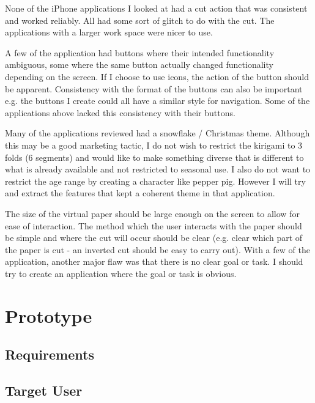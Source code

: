 \documentclass[11pt]{article}
\begin{document}
            None of the iPhone applications I looked at had a cut action that was consistent and worked reliably. All had some sort of glitch to do with the cut. The applications with a larger work space were nicer to use. 
            
            A few of the application had buttons where their intended functionality ambiguous, some where the same button actually changed functionality depending on the screen. If I choose to use icons, the action of the button should be apparent. Consistency with the format of the buttons can also be important e.g. the buttons I create could all have a similar style for navigation. Some of the applications above lacked this consistency with their buttons. 
            
            Many of the applications reviewed had a snowflake / Christmas theme. Although this may be a good marketing tactic, I do not wish to restrict the kirigami to 3 folds (6 segments) and would like to make something diverse that is different to what is already available and not restricted to seasonal use. I also do not want to restrict the age range by creating a character like pepper pig. However I will try and extract the features that kept a coherent theme in that application.
            
            The size of the virtual paper should be large enough on the screen to allow for ease of interaction. The method which the user interacts with the paper should be simple and where the cut will occur should be clear (e.g. clear which part of the paper is cut - an inverted cut should be easy to carry out). 
            With a few of the application, another major flaw was that there is no clear goal or task. I should try to create an application where the goal or task is obvious.


\newpage
\section{Prototype}

    \subsection{Requirements}

        \paragraph{}

    \subsection{Target User}
    
\end{document}
